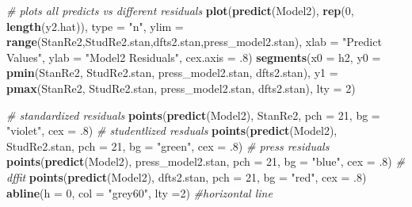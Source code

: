 \documentclass[]{article}
\newenvironment{Shaded}{\begin{snugshade}}{\end{snugshade}}
\newcommand{\KeywordTok}[1]{\textcolor[rgb]{0.13,0.29,0.53}{\textbf{#1}}}
\newcommand{\DataTypeTok}[1]{\textcolor[rgb]{0.13,0.29,0.53}{#1}}
\newcommand{\DecValTok}[1]{\textcolor[rgb]{0.00,0.00,0.81}{#1}}
\newcommand{\StringTok}[1]{\textcolor[rgb]{0.31,0.60,0.02}{#1}}
\newcommand{\CommentTok}[1]{\textcolor[rgb]{0.56,0.35,0.01}{\textit{#1}}}
\newcommand{\NormalTok}[1]{#1}
\begin{document}
\begin{Shaded}
\begin{Highlighting}[]
\CommentTok{# plots all predicts vs different residuals}
\KeywordTok{plot}\NormalTok{(}\KeywordTok{predict}\NormalTok{(Model2), }\KeywordTok{rep}\NormalTok{(}\DecValTok{0}\NormalTok{, }\KeywordTok{length}\NormalTok{(y2.hat)), }\DataTypeTok{type =} \StringTok{"n"}\NormalTok{,}
     \DataTypeTok{ylim =} \KeywordTok{range}\NormalTok{(StanRe2,StudRe2.stan,dfts2.stan,press_model2.stan), }
     \DataTypeTok{xlab =} \StringTok{"Predict Values"}\NormalTok{,}
     \DataTypeTok{ylab =} \StringTok{"Model2 Residuals"}\NormalTok{,}
     \DataTypeTok{cex.axis =}\NormalTok{ .}\DecValTok{8}\NormalTok{)}
\KeywordTok{segments}\NormalTok{(}\DataTypeTok{x0 =}\NormalTok{ h2,}
         \DataTypeTok{y0 =} \KeywordTok{pmin}\NormalTok{(StanRe2, StudRe2.stan, press_model2.stan, dfts2.stan),}
         \DataTypeTok{y1 =} \KeywordTok{pmax}\NormalTok{(StanRe2, StudRe2.stan, press_model2.stan, dfts2.stan),}
         \DataTypeTok{lty =} \DecValTok{2}\NormalTok{)}

\CommentTok{# standardized residuals}
\KeywordTok{points}\NormalTok{(}\KeywordTok{predict}\NormalTok{(Model2), StanRe2, }\DataTypeTok{pch =} \DecValTok{21}\NormalTok{, }\DataTypeTok{bg =} \StringTok{"violet"}\NormalTok{, }\DataTypeTok{cex =}\NormalTok{ .}\DecValTok{8}\NormalTok{)}
\CommentTok{# studentlized resduals}
\KeywordTok{points}\NormalTok{(}\KeywordTok{predict}\NormalTok{(Model2), StudRe2.stan, }\DataTypeTok{pch =} \DecValTok{21}\NormalTok{, }\DataTypeTok{bg =} \StringTok{"green"}\NormalTok{, }\DataTypeTok{cex =}\NormalTok{ .}\DecValTok{8}\NormalTok{) }
\CommentTok{# press residuals}
\KeywordTok{points}\NormalTok{(}\KeywordTok{predict}\NormalTok{(Model2), press_model2.stan, }\DataTypeTok{pch =} \DecValTok{21}\NormalTok{, }\DataTypeTok{bg =} \StringTok{"blue"}\NormalTok{, }\DataTypeTok{cex =}\NormalTok{ .}\DecValTok{8}\NormalTok{)}
\CommentTok{# dffit}
\KeywordTok{points}\NormalTok{(}\KeywordTok{predict}\NormalTok{(Model2), dfts2.stan, }\DataTypeTok{pch =} \DecValTok{21}\NormalTok{, }\DataTypeTok{bg =} \StringTok{"red"}\NormalTok{, }\DataTypeTok{cex =}\NormalTok{ .}\DecValTok{8}\NormalTok{)}
\KeywordTok{abline}\NormalTok{(}\DataTypeTok{h =} \DecValTok{0}\NormalTok{, }\DataTypeTok{col =} \StringTok{"grey60"}\NormalTok{, }\DataTypeTok{lty =}\DecValTok{2}\NormalTok{) }\CommentTok{#horizontal line}



\end{Highlighting}
\end{Shaded}
\end{document}
